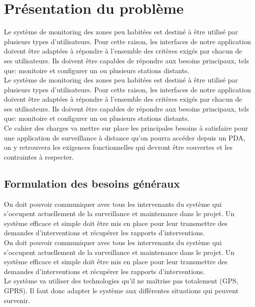 \section{Présentation du problème}



Le système de monitoring des zones peu habitées est destiné à être utilisé par plusieurs types 
d'utilisateurs. Pour cette raison, les interfaces de notre application doivent être adaptées à 
répondre à l'ensemble des critères exigés par chacun de ses utilisateurs.
Ils doivent être capables de répondre aux besoins principaux, tels que: monitoire et configurer 
un ou plusieurs stations distants.\\

Le système de monitoring des zones peu habitées est destiné à être utilisé par plusieurs types d'utilisateurs. Pour cette raison, les interfaces de notre application doivent être adaptées à répondre à l'ensemble des critères exigés par chacun de ses utilisateurs.
Ils doivent être capables de répondre aux besoins principaux, tels que: monitoire et configurer un ou plusieurs stations distants.\\


Ce cahier des charges va mettre sur place les principales besoins à satisfaire pour une application 
de surveillance à distance qu'on pourra accéder depuis un PDA, on y retrouvera les exigences 
fonctionnelles qui devront être couvertes et les contraintes à respecter.


\subsection{Formulation des besoins généraux}


On doit pouvoir communiquer avec tous les intervenants du système qui s'occupent actuellement de 
la surveillance et maintenance dans le projet. Un système efficace et simple doit être mis en place 
pour leur transmettre des demandes d'interventions et récupérer les rapports d'interventions.\\

On doit pouvoir communiquer avec tous les intervenants du système qui s'occupent actuellement de la surveillance et maintenance dans le projet. Un système efficace et simple doit être mis en place pour leur transmettre des demandes d'interventions et récupérer les rapports d'interventions.\\


Le système va utiliser des technologies qu'il ne maîtrise pas totalement (GPS, GPRS). Il faut donc 
adapter le système aux différentes situations qui peuvent survenir.\\


